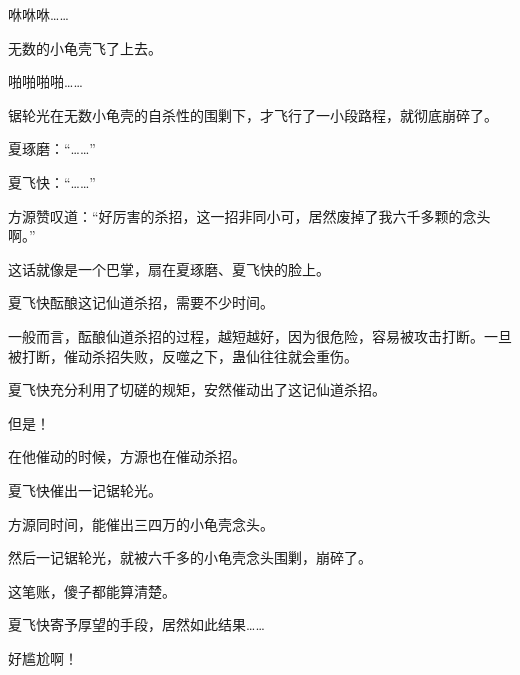 \begin{this_body}
咻咻咻……

无数的小龟壳飞了上去。

啪啪啪啪……

锯轮光在无数小龟壳的自杀性的围剿下，才飞行了一小段路程，就彻底崩碎了。

夏琢磨：“……”

夏飞快：“……”

方源赞叹道：“好厉害的杀招，这一招非同小可，居然废掉了我六千多颗的念头啊。”

这话就像是一个巴掌，扇在夏琢磨、夏飞快的脸上。

夏飞快酝酿这记仙道杀招，需要不少时间。

一般而言，酝酿仙道杀招的过程，越短越好，因为很危险，容易被攻击打断。一旦被打断，催动杀招失败，反噬之下，蛊仙往往就会重伤。

夏飞快充分利用了切磋的规矩，安然催动出了这记仙道杀招。

但是！

在他催动的时候，方源也在催动杀招。

夏飞快催出一记锯轮光。

方源同时间，能催出三四万的小龟壳念头。

然后一记锯轮光，就被六千多的小龟壳念头围剿，崩碎了。

这笔账，傻子都能算清楚。

夏飞快寄予厚望的手段，居然如此结果……

好尴尬啊！

\end{this_body}

